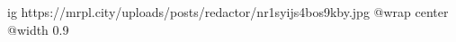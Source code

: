  
 
 
 
 

\ifcmt
  ig https://mrpl.city/uploads/posts/redactor/nr1syijs4bos9kby.jpg
  @wrap center
  @width 0.9
\fi
